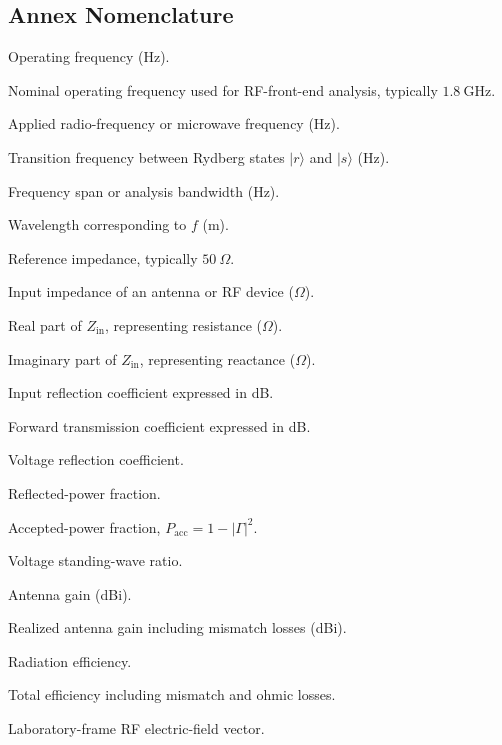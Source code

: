 \documentclass{ieeeaccess}
\begin{document}
\subsection{Annex Nomenclature}

\begin{IEEEdescription}

\item[$f$] Operating frequency (Hz).
\item[$f_0$] Nominal operating frequency used for RF-front-end analysis, typically \(1.8~\mathrm{GHz}\).
\item[$f_{\mathrm{RF}}$] Applied radio-frequency or microwave frequency (Hz).
\item[$f_{rs}$] Transition frequency between Rydberg states \(|r\rangle\) and \(|s\rangle\) (Hz).
\item[$\Delta f$] Frequency span or analysis bandwidth (Hz).
\item[$\lambda$] Wavelength corresponding to \(f\) (m).
\item[$Z_0$] Reference impedance, typically \(50~\Omega\).
\item[$Z_{\mathrm{in}}$] Input impedance of an antenna or RF device (\(\Omega\)).
\item[$R$] Real part of \(Z_{\mathrm{in}}\), representing resistance (\(\Omega\)).
\item[$X$] Imaginary part of \(Z_{\mathrm{in}}\), representing reactance (\(\Omega\)).
\item[$S_{11}$] Input reflection coefficient expressed in dB.
\item[$S_{21}$] Forward transmission coefficient expressed in dB.
\item[$\Gamma$] Voltage reflection coefficient.
\item[$|\Gamma|^2$] Reflected-power fraction.
\item[$P_{\mathrm{acc}}$] Accepted-power fraction, \(P_{\mathrm{acc}}=1-|\Gamma|^2\).
\item[$\mathrm{VSWR}$] Voltage standing-wave ratio.
\item[$G$] Antenna gain (dBi).
\item[$G_r$] Realized antenna gain including mismatch losses (dBi).
\item[$\eta_{\mathrm{rad}}$] Radiation efficiency.
\item[$\eta_{\mathrm{tot}}$] Total efficiency including mismatch and ohmic losses.
\item[$\mathbf{E}_{\mathrm{lab}}$] Laboratory-frame RF electric-field vector.

\end{IEEEdescription}
\end{document}
